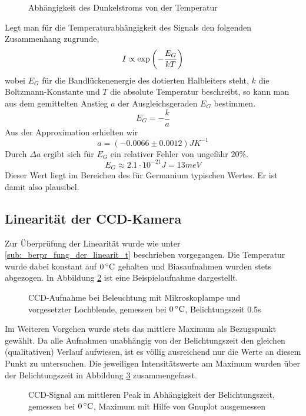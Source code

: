 		\begin{figure}
			\center
			
			\caption{Abhängigkeit des Dunkelstroms von der Temperatur}
			\label{fig:dark-temp}
		\end{figure}

		Legt man für die Temperaturabhängigkeit des Signals den folgenden Zusammenhang zugrunde,
		\[ I \propto \exp\left( -\frac{E_G}{kT} \right) \]
		wobei $E_G$ für die Bandlückenenergie des dotierten Halbleiters steht, $k$ die Boltzmann-Konstante und $T$ die absolute Temperatur beschreibt, so kann man aus dem gemittelten Anstieg $a$ der Ausgleichsgeraden $E_G$ bestimmen.
		\[ E_G = -\frac{k}{a} \]
		Aus der Approximation erhielten wir
		\[ a = (-0.0066 \pm 0.0012)\unit{JK}^{-1} \]
		Durch $\Delta a$ ergibt sich für $E_G$ ein relativer Fehler von ungefähr $20\unit{\%}$.
		\[ E_G \approx 2.1\cdot 10^{-21}\unit{J} = 13\unit{meV} \]
		Dieser Wert liegt im Bereichen des für Germanium typischen Wertes.
		Er ist damit also plausibel.
	


	\subsection{Linearität der CCD-Kamera} %
	\label{sub:linearit_t_der_ccd_kamera}

		Zur Überprüfung der Linearität wurde wie unter \ref{sub:_berpr_fung_der_linearit_t} beschrieben vorgegangen.
		Die Temperatur wurde dabei konstant auf $0\, \text{$^\circ$C}$ gehalten und Biasaufnahmen wurden stets abgezogen.
		In Abbildung \ref{linspec} ist eine Beispielaufnahme dargestellt.

		\begin{figure}
			\center
			
			\caption{CCD-Aufnahme bei Beleuchtung mit Mikroskoplampe und vorgesetzter Lochblende, gemessen bei $0\, \text{$^\circ$C}$, Belichtungszeit 0.5s}
			\label{linspec}
		\end{figure}

		Im Weiteren Vorgehen wurde stets das mittlere Maximum als Bezugspunkt gewählt.
		Da alle Aufnahmen unabhängig von der Belichtungszeit den gleichen (qualitativen) Verlauf aufwiesen, ist es völlig ausreichend nur die Werte an diesem Punkt zu untersuchen.
		Die jeweiligen Intensitätswerte am Maximum wurden über der Belichtungszeit in Abbildung \ref{linrise} zusammengefasst.

		\begin{figure}
			\center
			
			\caption{CCD-Signal am mittleren Peak in Abhängigkeit der Belichtungszeit, gemessen bei $0\, \text{$^\circ$C}$, Maximum mit Hilfe von Gnuplot ausgemessen}
			\label{linrise}
		\end{figure}

